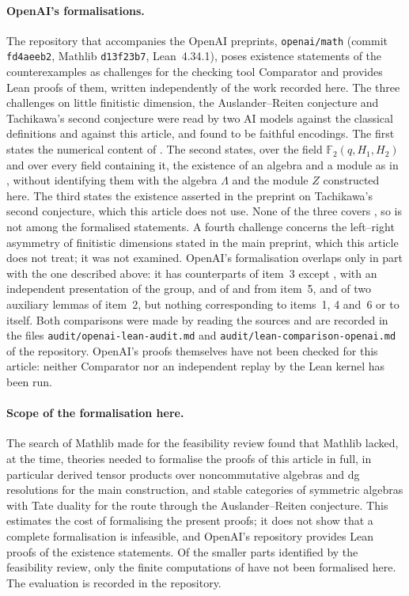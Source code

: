 \paragraph{OpenAI's formalisations.}
The repository that accompanies the OpenAI preprints,
\texttt{openai/math} (commit \texttt{fd4aeeb2}, Mathlib \texttt{d13f23b7},
Lean~4.34.1), poses
existence statements of the counterexamples as challenges for the checking
tool Comparator and provides Lean proofs of them, written independently of
the work recorded here. The three challenges on little finitistic dimension,
the Auslander--Reiten conjecture and Tachikawa's second conjecture were read
by two AI models against the classical definitions and against this article,
and found to be faithful encodings. The first states the numerical content of
. The second states, over the field $\mathbb{F}_2(q,H_1,H_2)$
and over every field containing it, the existence of an algebra and a module
as in , without identifying them with the algebra
$\Lambda$ and the module $Z$ constructed here. The third states the existence
asserted in the preprint on Tachikawa's second conjecture, which this article
does not use. None of the three covers , so
 is not among the formalised statements. A fourth
challenge concerns the left--right asymmetry of finitistic dimensions stated
in the main preprint, which this article does not treat; it was not examined.
OpenAI's formalisation overlaps only in part with the one described above:
it has counterparts of item~3 except , with an
independent presentation of the group, and of  and
 from item~5, and of two auxiliary lemmas of
item~2, but nothing corresponding to items~1, 4 and~6 or to
 itself. Both comparisons were made by reading the sources and are recorded in the
files \texttt{audit/openai-lean-audit.md} and
\texttt{audit/lean-comparison-openai.md} of the repository. OpenAI's proofs themselves have not been
checked for this article: neither Comparator nor an independent replay by the
Lean kernel has been run.

\paragraph{Scope of the formalisation here.}
The search of Mathlib made for the feasibility review found that Mathlib
lacked, at the time, theories needed to formalise the proofs of this article
in full, in particular derived tensor products over noncommutative algebras
and dg resolutions for the main construction, and stable categories of
symmetric algebras with Tate duality for the route through the
Auslander--Reiten conjecture. This estimates the cost of formalising the
present proofs; it does not show that a complete formalisation is
infeasible, and OpenAI's repository provides Lean proofs of the existence
statements. Of the smaller parts identified by the feasibility review, only
the finite computations of  have not been formalised here.
The evaluation is recorded in the repository.
